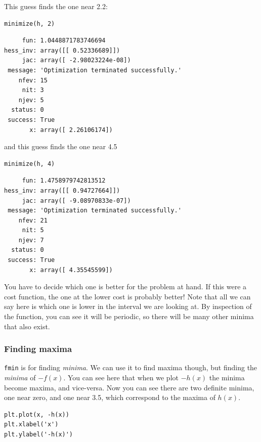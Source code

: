 \documentclass[11pt]{article}
\begin{document}
This guess finds the one near 2.2:

\begin{verbatim}
minimize(h, 2)
\end{verbatim}

\begin{verbatim}
     fun: 1.0448871783746694
hess_inv: array([[ 0.52336689]])
     jac: array([ -2.98023224e-08])
 message: 'Optimization terminated successfully.'
    nfev: 15
     nit: 3
    njev: 5
  status: 0
 success: True
       x: array([ 2.26106174])
\end{verbatim}

and this guess finds the one near 4.5

\begin{verbatim}
minimize(h, 4)
\end{verbatim}

\begin{verbatim}
     fun: 1.4758979742813512
hess_inv: array([[ 0.94727664]])
     jac: array([ -9.08970833e-07])
 message: 'Optimization terminated successfully.'
    nfev: 21
     nit: 5
    njev: 7
  status: 0
 success: True
       x: array([ 4.35545599])
\end{verbatim}

You have to decide which one is better for the problem at hand. If this were a cost function, the one at the lower cost is probably better! Note that all we can say here is which one is lower in the interval we are looking at. By inspection of the function, you can see it will be periodic, so there will be many other minima that also exist.

\subsubsection{Finding maxima}
\label{sec:orgfbf6d23}

\texttt{fmin} is for finding \emph{minima}. We can use it to find maxima though, but finding the \emph{minima} of \(-f(x)\). You can see here that when we plot \(-h(x)\) the minima become maxima, and vice-versa. Now you can see there are two definite minima, one near zero, and one near 3.5, which correspond to the maxima of \(h(x)\).

\begin{verbatim}
plt.plot(x, -h(x))
plt.xlabel('x')
plt.ylabel('-h(x)')
\end{verbatim}
\end{document}
